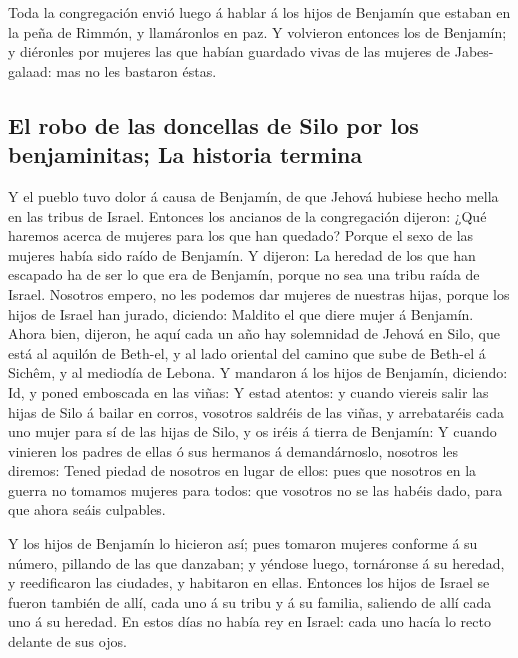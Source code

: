  Toda la congregación envió luego á hablar á los hijos de
Benjamín que estaban en la peña de Rimmón, y llamáronlos en paz.
 Y volvieron entonces los de Benjamín; y diéronles por
mujeres las que habían guardado vivas de las mujeres de Jabes-galaad:
mas no les bastaron éstas.

\hypertarget{el-robo-de-las-doncellas-de-silo-por-los-benjaminitas-la-historia-termina}{%
\subsection{El robo de las doncellas de Silo por los benjaminitas; La
historia
termina}\label{el-robo-de-las-doncellas-de-silo-por-los-benjaminitas-la-historia-termina}}

 Y el pueblo tuvo dolor á causa de Benjamín, de que Jehová
hubiese hecho mella en las tribus de Israel.  Entonces los
ancianos de la congregación dijeron: ¿Qué haremos acerca de mujeres para
los que han quedado? Porque el sexo de las mujeres había sido raído de
Benjamín.  Y dijeron: La heredad de los que han escapado ha
de ser lo que era de Benjamín, porque no sea una tribu raída de Israel.
 Nosotros empero, no les podemos dar mujeres de nuestras
hijas, porque los hijos de Israel han jurado, diciendo: Maldito el que
diere mujer á Benjamín.  Ahora bien, dijeron, he aquí cada
un año hay solemnidad de Jehová en Silo, que está al aquilón de Beth-el,
y al lado oriental del camino que sube de Beth-el á Sichêm, y al
mediodía de Lebona.  Y mandaron á los hijos de Benjamín,
diciendo: Id, y poned emboscada en las viñas:  Y estad
atentos: y cuando viereis salir las hijas de Silo á bailar en corros,
vosotros saldréis de las viñas, y arrebataréis cada uno mujer para sí de
las hijas de Silo, y os iréis á tierra de Benjamín:  Y
cuando vinieren los padres de ellas ó sus hermanos á demandárnoslo,
nosotros les diremos: Tened piedad de nosotros en lugar de ellos: pues
que nosotros en la guerra no tomamos mujeres para todos: que vosotros no
se las habéis dado, para que ahora seáis culpables.

 Y los hijos de Benjamín lo hicieron así; pues tomaron
mujeres conforme á su número, pillando de las que danzaban; y yéndose
luego, tornáronse á su heredad, y reedificaron las ciudades, y habitaron
en ellas.  Entonces los hijos de Israel se fueron también
de allí, cada uno á su tribu y á su familia, saliendo de allí cada uno á
su heredad.  En estos días no había rey en Israel: cada uno
hacía lo recto delante de sus ojos.
